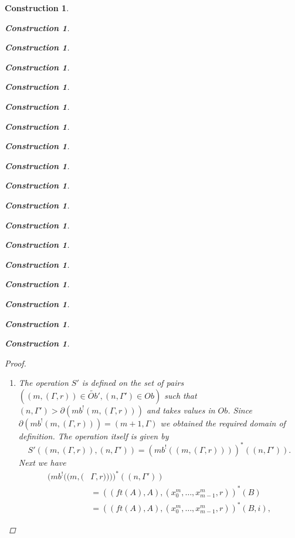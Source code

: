 \documentclass[onecolumn,12pt]{amsart}
\numberwithin{proposition}{subsection}
\newtheorem{construction}[proposition]{Construction}
\newcommand{\wt}{\widetilde}
\begin{document}
\begin{construction}
\begin{construction}
\begin{construction}
\begin{construction}
\begin{construction}
\begin{construction}
\begin{construction}
\begin{construction}
\begin{construction}
\begin{construction}
\begin{construction}
\begin{construction}
\begin{construction}
\begin{construction}
\begin{construction}
\begin{construction}
\begin{construction}
\begin{construction}
\begin{proof}
\begin{enumerate}
To verify the formula for the operation itself consider the equalities:
%
\begin{equation*}
  \begin{split}
    \wt{T}'((&m,\Gamma),(n,(\Gamma',s)))=mb(p_{(m,\Gamma)}^*(mb^!(n,(\Gamma',s))))\\&=
    mb(p_{(m,\Gamma)}^*((ft((n+1,\Gamma')),((n+1,\Gamma'),(x^{n}_0,\dots,x^{n}_{n-1},s))))),
  \end{split}
\end{equation*}
%
where the first equality is by Definition \ref{2015.08.26.def1}(2). By Lemma
\ref{2015.09.03.l1} we can extend these equalities as follows:
\begin{equation*}
  \begin{split}
    mb(&p_{(m,\Gamma)}^*((ft((n+1,\Gamma')),((n+1,\Gamma'),(x^{n}_0,\dots,x^{n}_{n-1},s)))))\\&=
       mb(p_{X}^*(ft(Y)),(p_{X}^*(Y),(x^{n+1}_0,\dots,x^{n+1}_{n},(qq^{n-m+1}(\iota^1_{m-1}))(s))))\\&=
       (n+1,(p_{X}^*(Y),\partial_{n}^{m-1}(s)))\\&=
       (n+1,(T((m,\Gamma),(n+1,\Gamma')),\partial_n^{m-1}(s))),
  \end{split}
\end{equation*}
where $X=(m,\Gamma)$, $Y=(n+1,\Gamma')$, the first equality is by Lemma
\ref{2015.09.03.l1}, the second by Lemma \ref{2015.08.26.l3a} and the third by
Definition \ref{2015.08.26.def1}(1).
%
\item The operation $S'$ is defined on the set of pairs $((m,(\Gamma,r))\in
  \wt{Ob}',(n,\Gamma')\in Ob)$ such that
  $(n,\Gamma')>\partial(mb^!(m,(\Gamma,r)))$ and takes values in $Ob$. Since
  $\partial(mb^!(m,(\Gamma,r)))=(m+1,\Gamma)$ we obtained the required domain
  of definition. The operation itself is given by
%
\begin{equation}\label{2016.01.21.eq2}
S'((m,(\Gamma,r)),(n,\Gamma'))=(mb^!((m,(\Gamma,r))))^*((n,\Gamma')).
\end{equation}%
%
Next we have 
%
\begin{equation*}
  \begin{split}
    (mb^!((m,(&\Gamma,r))))^*((n,\Gamma'))
    \\&=
    ((ft(A),A),(x^{m}_0,\dots,x^{m}_{m-1},r))^*(B)
    \\&=
    ((ft(A),A),(x^{m}_0,\dots,x^{m}_{m-1},r))^*(B,i),
  \end{split}
\end{equation*}

\end{enumerate}
\end{proof}
\end{construction}
\end{construction}
\end{construction}
\end{construction}
\end{construction}
\end{construction}
\end{construction}
\end{construction}
\end{construction}
\end{construction}
\end{construction}
\end{construction}
\end{construction}
\end{construction}
\end{construction}
\end{construction}
\end{construction}
\end{construction}
\end{document}
